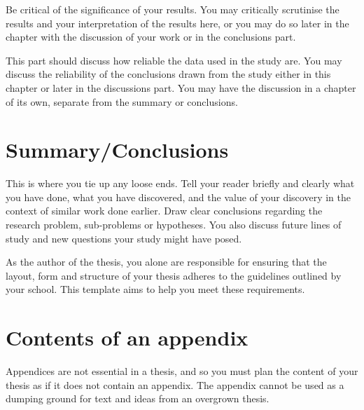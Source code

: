 \documentclass[english, 12pt, a4paper, elec, utf8, a-2b, online]{aaltothesis}
\begin{document}
Be critical of the significance of your results. You may critically scrutinise 
the results and your interpretation of the results here, or you may do so later 
in the chapter with the discussion of your work or in the conclusions part.

This part should discuss how reliable the data used in the study are. You may 
discuss the reliability of the conclusions drawn from the study either in this 
chapter or later in the discussions part. You may have the discussion in a 
chapter of its own, separate from the summary or conclusions.


\clearpage

\section{Summary/Conclusions}
\label{sec:summary}

This is where you tie up any loose ends. Tell your reader briefly and clearly 
what you have done, what you have discovered, and the value of your discovery 
in the context of similar work done earlier. Draw clear conclusions regarding 
the research problem, sub-problems or hypotheses. You also discuss future lines 
of study and new questions your study might have posed.

As the author of the thesis, you alone are responsible for ensuring that the 
layout, form and structure of your thesis adheres to the guidelines outlined by 
your school. This template aims to help you meet these requirements.



\clearpage
\thesisbibliography
\printbibliography

\newpage
 

\clearpage

\thesisappendix

\section{Contents of an appendix}
\label{app:contents}

Appendices are not essential in a thesis, and so you must plan the content of 
your thesis as if it does not contain an appendix. The appendix cannot be used 
as a dumping ground for text and ideas from an overgrown thesis.
\end{document}

